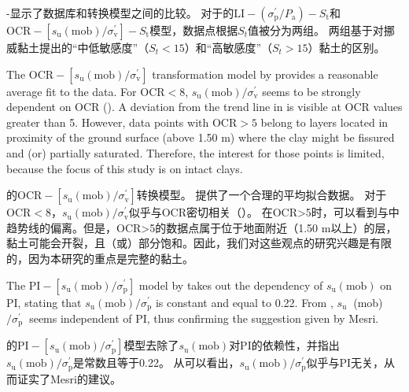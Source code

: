 \begin{ParaColumn}
    \switchcolumn

    -显示了数据库和转换模型之间的比较。 对于\citet{Ching2012522}的$\mathrm{LI}-\left(\sigma_{\mathrm{p}}^{\prime} / P_{\mathrm{a}}\right)-S_{\mathrm{t}}$和$\mathrm{OCR}-\left[s_{\mathrm{u}}(\mathrm{mob}) / \sigma_{\mathrm{v}}^{\prime}\right]-S_{\mathrm{t}}$模型，数据点根据$S_t$值被分为两组。 两组基于\citet{Karlsrud20131273}对挪威黏土提出的“中低敏感度”（$S_t<15$）和“高敏感度”（$S_t>15$）黏土的区别。

    \switchcolumn*

    The $\mathrm{OCR}-\left[s_{\mathrm{u}}(\mathrm{mob}) / \sigma_{\mathrm{v}}^{\prime}\right]$ transformation model by \citet{Jamiolkowski198557} provides a reasonable average fit to the data. For $\mathrm{OCR}<8$, $s_{\mathrm{u}}(\mathrm{mob}) / \sigma_{\mathrm{v}}^{\prime}$ seems to be strongly dependent on OCR (). A deviation from the trend line in  is visible at OCR values greater than 5. However, data points with $\mathrm{OCR}>5$ belong to layers located in proximity of the ground surface (above 1.50 m) where the clay might be fissured and (or) partially saturated. Therefore, the interest for those points is limited, because the focus of this study is on intact clays.

    \switchcolumn

    \citet{Jamiolkowski198557}的$\mathrm{OCR}-\left[s_{\mathrm{u}}(\mathrm{mob}) / \sigma_{\mathrm{v}}^{\prime}\right]$转换模型。  提供了一个合理的平均拟合数据。 对于$\mathrm{OCR}<8$，$s_{\mathrm{u}}(\mathrm{mob}) / \sigma_{\mathrm{v}}^{\prime}$似乎与OCR密切相关（）。 在OCR>5时，可以看到与中趋势线的偏离。但是，OCR>5的数据点属于位于地面附近（1.50 m以上）的层，黏土可能会开裂，且（或）部分饱和。因此，我们对这些观点的研究兴趣是有限的，因为本研究的重点是完整的黏土。

    \switchcolumn*

    The $\mathrm{PI}-\left[s_{\mathrm{u}}(\mathrm{mob}) / \sigma_{\mathrm{p}}^{\prime}\right]$ model by \citet{Mesri1975409,Mesri1989162} takes out the dependency of $s_{\mathrm{u}}(\mathrm{mob})$ on PI, stating that $s_{\mathrm{u}}(\mathrm{mob}) / \sigma_{\mathrm{p}}^{\prime}$ is constant and equal to 0.22. From , $s_{\text {u }}$ (mob) $/ \sigma_{\text {p }}^{\prime}$ seems independent of PI, thus confirming the suggestion given by Mesri.

    \switchcolumn

    \citet{Mesri1975409,Mesri1989162}的$\mathrm{PI}-\left[s_{\mathrm{u}}(\mathrm{mob}) / \sigma_{\mathrm{p}}^{\prime}\right]$模型去除了$s_{\mathrm{u}}(\mathrm{mob})$对PI的依赖性，并指出$s_{\mathrm{u}}(\mathrm{mob}) / \sigma_{\mathrm{p}}^{\prime}$是常数且等于0.22。 从可以看出，$s_{\mathrm{u}}(\mathrm{mob}) / \sigma_{\mathrm{p}}^{\prime}$似乎与PI无关，从而证实了Mesri的建议。


\end{ParaColumn}
